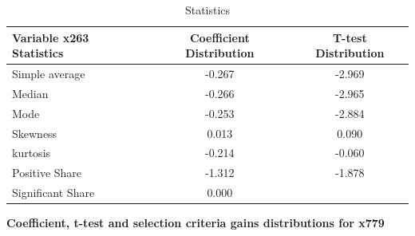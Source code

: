 \documentclass{article}
\begin{document}
\begin{table}[!h]
    \centering
    \caption{Statistics}
    \begin{tabular}{|l|c|c|}
    \hline
    Variable x263 Statistics &  Coefficient Distribution &  T-test Distribution  \\
    \hline
    \hline
    Simple average    & -0.267      & -2.969 \\
    \hline
    Median            & -0.266   & -2.965 \\
    \hline
    Mode              & -0.253     & -2.884 \\
    \hline
    Skewness          & 0.013      & 0.090 \\
    \hline
    kurtosis          & -0.214     & -0.060 \\
    \hline
    Positive Share    & -1.312     & -1.878 \\
    \hline
    Significant Share & 0.000 &  \\
    \hline
    \end{tabular}
\end{table}

\clearpage
\begin{center}
    \large{\textbf{Coefficient, t-test and selection criteria gains distributions for x779 }}
\end{center}

\vspace{-5mm}
\end{document}
